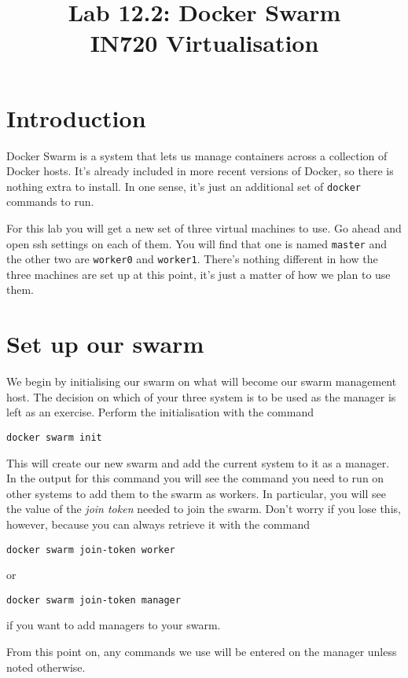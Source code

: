 \documentclass{article}
\begin{document}
\title{Lab 12.2: Docker Swarm \\ IN720 Virtualisation}
\date{}
\maketitle

\section*{Introduction}
Docker Swarm is a system that lets us manage containers across a collection of Docker hosts. It's already included in more recent versions of Docker, so there is nothing extra to install. In one sense, it's just an additional set of \texttt{docker} commands to run.

For this lab you will get a new set of three virtual machines to use. Go ahead and open ssh settings on each of them. You will find that one is named \texttt{master} and the other two are \texttt{worker0} and \texttt{worker1}. There's nothing different in how the three machines are set up at this point, it's just a matter of how we plan to use them.

\section{Set up our swarm}

We begin by initialising our swarm on what will become our swarm management host. The decision on which of your three system is to be used as the manager is left as an exercise. Perform the initialisation with the command

\texttt{docker swarm init}

This will create our new swarm and add the current system to it as a manager. In the output for this command you will see the command you need to run on other systems to add them to the swarm as workers. In particular, you will see the value of the \emph{join token} needed to join the swarm. Don't worry if you lose this, however, because you can always retrieve it with the command 

\texttt{docker swarm join-token worker} 

or 

\texttt{docker swarm join-token manager}

if you want to add managers to your swarm.

From this point on, any commands we use will be entered on the manager unless noted otherwise.
\end{document}
